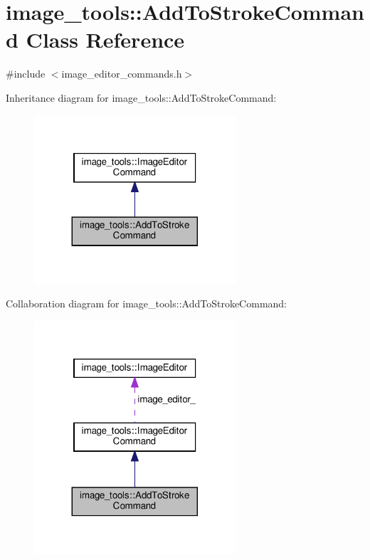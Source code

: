 \hypertarget{classimage__tools_1_1AddToStrokeCommand}{}\section{image\+\_\+tools\+:\+:Add\+To\+Stroke\+Command Class Reference}
\label{classimage__tools_1_1AddToStrokeCommand}


{\ttfamily \#include $<$image\+\_\+editor\+\_\+commands.\+h$>$}



Inheritance diagram for image\+\_\+tools\+:\+:Add\+To\+Stroke\+Command\+:
\nopagebreak
\begin{figure}[H]
\begin{center}
\leavevmode
\includegraphics[width=212pt]{classimage__tools_1_1AddToStrokeCommand__inherit__graph}
\end{center}
\end{figure}


Collaboration diagram for image\+\_\+tools\+:\+:Add\+To\+Stroke\+Command\+:
\nopagebreak
\begin{figure}[H]
\begin{center}
\leavevmode
\includegraphics[width=212pt]{classimage__tools_1_1AddToStrokeCommand__coll__graph}
\end{center}
\end{figure}
